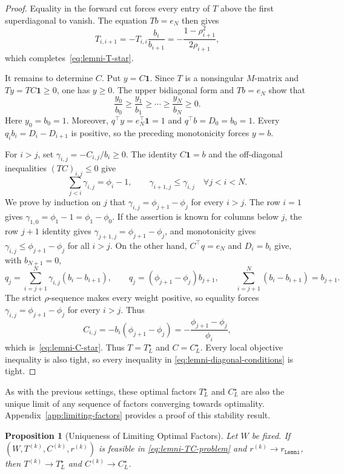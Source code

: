 \documentclass[11pt]{article}
\newtheorem{proposition}[thm]{Proposition}
\begin{document}
\begin{proof}
Equality in the forward cut forces every entry of $T$ above the first
superdiagonal to vanish. The equation $Tb=e_N$ then gives
\[
    T_{i,i+1}
    =-T_{i,i}\frac{b_i}{b_{i+1}}
    =-\frac{1-\rho_{i+1}^2}{2\rho_{i+1}},
\]
which completes~\eqref{eq:lemni-T-star}.

It remains to determine $C$. Put $y=C\mathbf1$. Since $T$ is a
nonsingular $M$-matrix and $Ty=TC\mathbf1\geq0$, one has
$y\geq0$. The upper bidiagonal form and $Tb=e_N$ show that
\[
    \frac{y_0}{b_0}\geq\frac{y_1}{b_1}\geq\cdots\geq\frac{y_N}{b_N}\geq0.
\]
Here $y_0=b_0=1$. Moreover, $q^\top y=e_N^\top\mathbf1=1$ and $q^\top b=D_0=b_0=1$.
Every $q_i b_i=D_i-D_{i+1}$ is positive, so the preceding monotonicity forces
$y=b$.

For $i>j$, set $\gamma_{i,j}=-C_{i,j}/b_i\geq0$. The identity
$C\mathbf1=b$ and the off-diagonal inequalities $(TC)_{i,j}\leq0$ give
\[
    \sum_{j<i}\gamma_{i,j}=\phi_i-1,
    \qquad
    \gamma_{i+1,j}\leq\gamma_{i,j}
    \quad \forall j<i<N.
\]
We prove by induction on $j$ that
$\gamma_{i,j}=\phi_{j+1}-\phi_j$ for every $i>j$. The row $i=1$ gives
$\gamma_{1,0}=\phi_1-1=\phi_1-\phi_0$. If the assertion is known for columns
below $j$, the row $j+1$ identity gives
$\gamma_{j+1,j}=\phi_{j+1}-\phi_j$, and monotonicity gives
$\gamma_{i,j}\leq\phi_{j+1}-\phi_j$ for all $i>j$. On the other hand,
$C^\top q=e_N$ and $D_i=b_i$ give, with $b_{N+1}=0$,
\[
    q_j=\sum_{i=j+1}^N\gamma_{i,j}(b_i-b_{i+1}),
    \qquad
    q_j=(\phi_{j+1}-\phi_j)b_{j+1},
    \qquad
    \sum_{i=j+1}^N(b_i-b_{i+1})=b_{j+1}.
\]
The strict $\rho$-sequence makes every weight positive, so equality forces
$\gamma_{i,j}=\phi_{j+1}-\phi_j$ for every $i>j$. Thus
\[
    C_{i,j}=-b_i(\phi_{j+1}-\phi_j)
    =-\frac{\phi_{j+1}-\phi_j}{\phi_i},
\]
which is~\eqref{eq:lemni-C-star}. Thus
$T=T_L^\star$ and $C=C_L^\star$. Every local objective
inequality is also tight, so every inequality in
\eqref{eq:lemni-diagonal-conditions} is tight.
\end{proof}

As with the previous settings, these optimal factors $T_L^\star$ and $C_L^\star$ are also the unique limit of any sequence of factors converging towards optimality. Appendix~\ref{app:limiting-factors} provides a proof of this stability result.

\begin{proposition}[Uniqueness of Limiting Optimal Factors]
\label{prop:lemni-limiting-factors}
Let $W$ be fixed. If $(W,T^{(k)},C^{(k)},r^{(k)})$ is feasible in
\eqref{eq:lemni-TC-problem} and $r^{(k)}\to r_\mathtt{Lemni}$, then $T^{(k)}\to T_L^\star$ and $C^{(k)}\to C_L^\star$.
\end{proposition}
\end{document}

